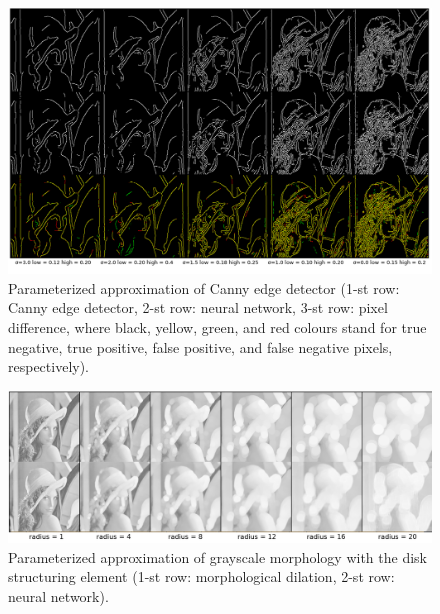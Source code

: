 
\begin{figure}[h]
\centering
\includegraphics[width=0.85\linewidth]{fig/par-canny.png}
\caption{Parameterized approximation of Canny edge detector (1-st row: Canny edge detector, 2-st row: neural network, 3-st row: pixel difference, where black, yellow, green, and red colours stand for true negative, true positive, false positive, and false negative pixels, respectively).}
\label{figure:ParCanny}
\end{figure}

\begin{figure}[h]
\centering
\includegraphics[width=0.85\linewidth]{fig/lena disk.png}
\caption{Parameterized approximation of grayscale morphology with the disk structuring element (1-st row: morphological dilation, 2-st row: neural network).}
\label{figure:ParMorphology}
\end{figure}



